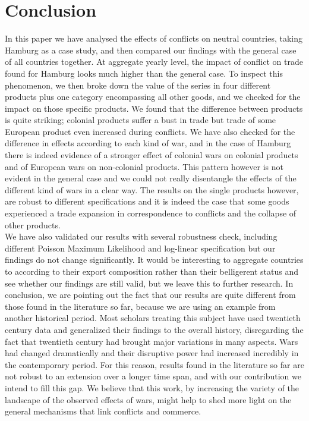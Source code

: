 \documentclass[12pt,a4paper,titlepage,english]{article}
\begin{document}
\section{Conclusion}
In this paper we have analysed the effects of conflicts on neutral countries, taking Hamburg as a case study, and then compared our findings with the general case of all countries together. At aggregate yearly level, the impact of conflict on trade found for Hamburg looks much higher than the general case. To inspect this phenomenon, we then broke down the value of the series in four different products plus one category encompassing all other goods, and we checked for the impact on those specific products. We found that the difference between products is quite striking; colonial products suffer a bust in trade but trade of some European product even increased during conflicts. We have also checked for the difference in effects according to each kind of war, and in the case of Hamburg there is indeed evidence of a stronger effect of colonial wars on colonial products and of European wars on non-colonial products. This pattern however is not evident in the general case and we could not really disentangle the effects of the different kind of wars in a clear way. The results on the single products however, are robust to different specifications and it is indeed the case that some goods experienced a trade expansion in correspondence to conflicts and the collapse of other products. \\
We have also validated our results with several robustness check, including different Poisson Maximum Likelihood and log-linear specification but our findings do not change significantly. It would be interesting to aggregate countries to according to their export composition rather than their belligerent status and see whether our findings are still valid, but we leave this to further research. 
In conclusion, we are pointing out the fact that our results are quite different from those found in the literature so far, because we are using an example from another historical period. Most scholars treating this subject have used twentieth century data and generalized their findings to the overall history, disregarding the fact that twentieth century had brought major variations in many aspects. Wars had changed dramatically and their disruptive power had increased incredibly in the contemporary period. For this reason, results found in the literature so far are not robust to an extension over a longer time span, and with our contribution we intend to fill this gap. We believe that this work, by increasing the variety of the landscape of the observed effects of wars, might help to shed more light on the general mechanisms that link conflicts and commerce.


\pagebreak

\renewcommand{\baselinestretch}{1.0}\normalsize



\end{document}
